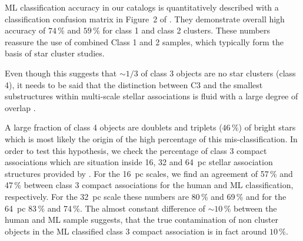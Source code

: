 ML classification accuracy in our catalogs is quantitatively described with a classification confusion matrix in Figure~2 of \citet{hannon_star_2023}. They demonstrate overall high accuracy of $74\,\%$ and $59\,\%$ for class 1 and class 2 clusters. These numbers reassure the use of combined Class 1 and 2 samples, which typically form the basis of star cluster studies. 

Even though this suggests that $\sim 1/3$ of class 3 objects are no star clusters (class 4), it needs to be said that the distinction between C3 and the smallest substructures within multi-scale stellar associations is fluid with a large degree of overlap \citep{larson_multi-scale_2022}. 

A large fraction of class 4 objects are doublets and triplets ($46\,\%$) of bright stars which is most likely the origin of the high percentage of this mis-classification. 
In order to test this hypothesis, we check the percentage of class 3 compact associations which are situation inside 16, 32 and 64~pc stellar association structures provided by \citet{larson_multi-scale_2022}. 
For the 16~pc scales, we find an agreement of 57\,\% and 47\,\% between class 3 compact associations for the human and ML classification, respectively. For the 32~pc scale these numbers are 80\,\% and 69\,\% and for the 64~pc 83\,\% and 74\,\%. The almost constant difference of $\sim10\,\%$ between the human and ML sample suggests, that the true contamination of non cluster objects in the ML classified class 3 compact association is in fact around $10\,\%$.
%


